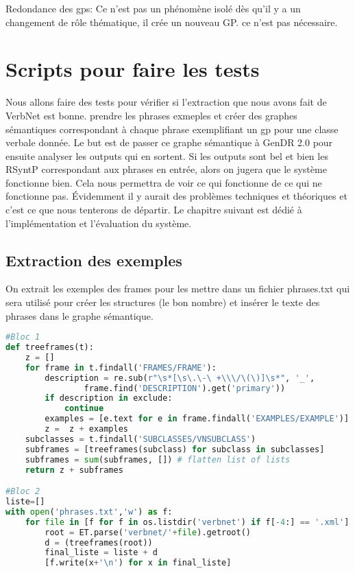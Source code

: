 Redondance des gps: Ce n'est pas un phénomène isolé dès qu'il y a un changement de rôle thématique, il crée un nouveau GP. ce n'est pas nécessaire.


\section{Scripts pour faire les tests}

Nous allons faire des tests pour vérifier si l'extraction que nous avons fait de VerbNet est bonne. prendre les phrases exmeples et créer des graphes sémantiques correspondant à chaque phrase exemplifiant un gp pour une classe verbale donnée. Le but est de passer ce graphe sémantique à GenDR 2.0 pour ensuite analyser les outputs qui en sortent. Si les outputs sont bel et bien les RSyntP correspondant aux phrases en entrée, alors on jugera que le système fonctionne bien. Cela nous permettra de voir ce qui fonctionne de ce qui ne fonctionne pas. Évidemment il y aurait des problèmes techniques et théoriques et c'est ce que nous tenterons de départir. Le chapitre suivant est dédié à l'implémentation et l'évaluation du système.

\subsection{Extraction des exemples}

On extrait les exemples des frames pour les mettre dans un fichier phrases.txt qui sera utilisé pour créer les structures (le bon nombre) et insérer le texte des phrases dans le graphe sémantique.

\begin{lstlisting}[language=Python, caption = Code pour extraire les phrases exemples de VerbNet]
#Bloc 1
def treeframes(t):
    z = []
    for frame in t.findall('FRAMES/FRAME'):
        description = re.sub(r"\s*[\s\.\-\ +\\\/\(\)]\s*", '_',
				frame.find('DESCRIPTION').get('primary'))
        if description in exclude:
            continue    
        examples = [e.text for e in frame.findall('EXAMPLES/EXAMPLE')]
        z =  z + examples 
    subclasses = t.findall('SUBCLASSES/VNSUBCLASS')
    subframes = [treeframes(subclass) for subclass in subclasses]
    subframes = sum(subframes, []) # flatten list of lists
    return z + subframes

#Bloc 2
liste=[]
with open('phrases.txt','w') as f:
    for file in [f for f in os.listdir('verbnet') if f[-4:] == '.xml']:
        root = ET.parse('verbnet/'+file).getroot()       
        d = (treeframes(root))
        final_liste = liste + d
        [f.write(x+'\n') for x in final_liste]

\end{lstlisting}


